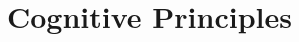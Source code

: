\documentclass[12pt]{article}
\begin{document}



\section{Cognitive Principles}\label{sect:representing}
\end{document}
